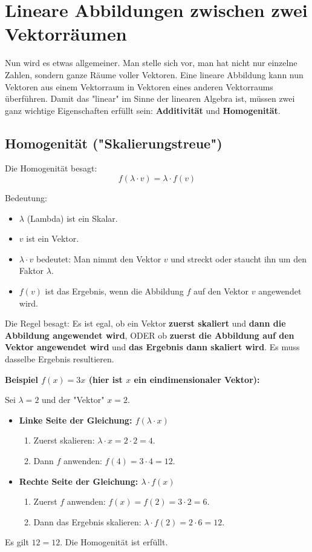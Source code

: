 \section{Lineare Abbildungen zwischen zwei Vektorräumen}

Nun wird es etwas allgemeiner. Man stelle sich vor, man hat nicht nur einzelne Zahlen, sondern ganze Räume voller Vektoren. Eine lineare Abbildung kann nun Vektoren aus einem Vektorraum in Vektoren eines anderen Vektorraums überführen. Damit das "linear" im Sinne der linearen Algebra ist, müssen zwei ganz wichtige Eigenschaften erfüllt sein: \textbf{Additivität} und \textbf{Homogenität}.

\subsection{Homogenität ("Skalierungstreue")}

Die Homogenität besagt:
$$f(\lambda \cdot v) = \lambda \cdot f(v)$$

Bedeutung:
\begin{itemize}
    \item $\lambda$ (Lambda) ist ein Skalar.
    \item $v$ ist ein Vektor.
    \item $\lambda \cdot v$ bedeutet: Man nimmt den Vektor $v$ und streckt oder staucht ihn um den Faktor $\lambda$.
    \item $f(v)$ ist das Ergebnis, wenn die Abbildung $f$ auf den Vektor $v$ angewendet wird.
\end{itemize}
Die Regel besagt: Es ist egal, ob ein Vektor \textbf{zuerst skaliert} und \textbf{dann die Abbildung angewendet wird}, ODER ob \textbf{zuerst die Abbildung auf den Vektor angewendet wird} und \textbf{das Ergebnis dann skaliert wird}. Es muss dasselbe Ergebnis resultieren.

\textbf{Beispiel $f(x) = 3x$ (hier ist $x$ ein eindimensionaler Vektor):}

Sei $\lambda = 2$ und der "Vektor" $x=2$.
\begin{itemize}
    \item \textbf{Linke Seite der Gleichung: $f(\lambda \cdot x)$}
    \begin{enumerate}
        \item Zuerst skalieren: $\lambda \cdot x = 2 \cdot 2 = 4$.
        \item Dann $f$ anwenden: $f(4) = 3 \cdot 4 = 12$.
    \end{enumerate}
    \item \textbf{Rechte Seite der Gleichung: $\lambda \cdot f(x)$}
    \begin{enumerate}
        \item Zuerst $f$ anwenden: $f(x) = f(2) = 3 \cdot 2 = 6$.
        \item Dann das Ergebnis skalieren: $\lambda \cdot f(2) = 2 \cdot 6 = 12$.
    \end{enumerate}
\end{itemize}
Es gilt $12 = 12$. Die Homogenität ist erfüllt.

